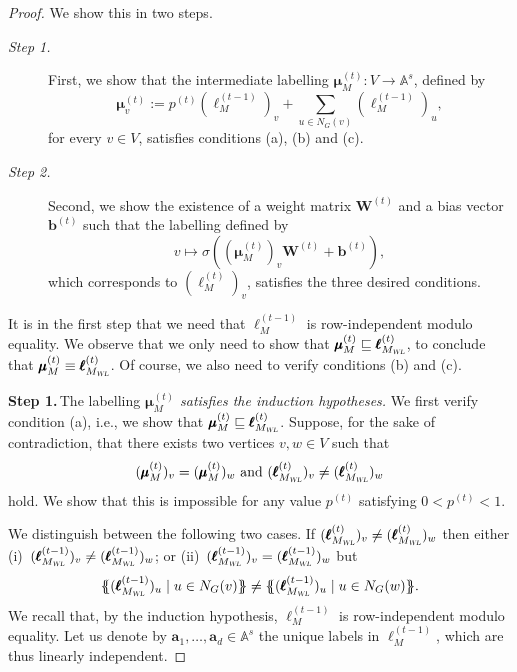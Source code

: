 \begin{proof}
We show this in two steps.
\begin{description}
	\item [\textit{Step 1.}] First, we show that the intermediate labelling $\pmb{\mu}_M^{(t)}:V\to\mathbb{A}^s$, defined by
\begin{equation}\pmb{\mu}_v^{(t)}:=p^{(t)}(\pmb{\ell}_M^{(t-1)})_v+\sum_{u\in N_G(v)}(\pmb{\ell}_M^{(t-1)})_u, \label{eq:mu}
\end{equation}
for every $v\in V$, satisfies conditions (a), (b) and (c). 
\item  [\textit{Step 2.}]
Second, we show the existence of a weight matrix $\mathbf{W}^{(t)}$ and a bias vector
$\mathbf{b}^{(t)}$ such that the labelling defined by
$$
v\mapsto \sigma\left((\pmb{\mu}_M^{(t)})_v\mathbf{W}^{(t)}+ \mathbf{b}^{(t)}\right),
$$
which corresponds to $(\pmb{\ell}_M^{(t)})_v$, satisfies the  three desired conditions.
\end{description}
It is in the first step that we need that $\pmb{\ell}_M^{(t-1)}$ is row-independent modulo equality. We observe that we only need to show that $\pmb{\mu}_M^{(t)}\sqsubseteq \pmb{\ell}_{M_{\textsl{WL}}}^{(t)}$, to conclude that $\pmb{\mu}_M^{(t)}\equiv \pmb{\ell}_{M_{\textsl{WL}}}^{(t)}$. Of course, we also need to verify conditions (b) and (c).

\smallskip
\noindent
\textbf{Step 1.\,}The labelling \textit{$\pmb{\mu}_M^{(t)}$ satisfies the induction hypotheses.}
We first verify condition (a), i.e.,
we show that $\pmb{\mu}_M^{(t)}\sqsubseteq \pmb{\ell}_{M_{\textsl{WL}}}^{(t)}$. Suppose, for the sake of contradiction, that there exists two vertices $v,w\in V$ such that 
	\begin{equation}
		(\pmb{\mu}_M^{(t)})_{v}=(\pmb{\mu}_M^{(t)})_{w} \text{ and } (\pmb{\ell}_{M_{\textsl{WL}}}^{(t)})_v\neq(\pmb{\ell}_{M_{\textsl{WL}}}^{(t)})_w \label{eq:contra}
	\end{equation}
	hold.
We show that this is impossible for any value $p^{(t)}$ satisfying $0<p^{(t)}<1$. 

We distinguish between the following two cases. If $ (\pmb{\ell}_{M_{\textsl{WL}}}^{(t)})_v\neq(\pmb{\ell}_{M_{\textsl{WL}}}^{(t)})_w$ then either
(i)~$(\pmb{\ell}_{M_{\textsl{WL}}}^{(t-1)})_v\neq(\pmb{\ell}_{M_{\textsl{WL}}}^{(t-1)})_w$; or 
(ii)~$(\pmb{\ell}_{M_{\textsl{WL}}}^{(t-1)})_v=(\pmb{\ell}_{M_{\textsl{WL}}}^{(t-1)})_w$
but
	$$
	\ldbl (\pmb{\ell}_{M_{\textsl{WL}}}^{(t-1)})_u \st u \in N_G(v) \rdbl\neq
	\ldbl(\pmb{\ell}_{M_{\textsl{WL}}}^{(t-1)})_u \st u \in N_G(w) \rdbl.
	$$
We recall that, by the induction hypothesis, $\pmb{\ell}^{(t-1)}_M$ is row-independent modulo equality. Let us denote by $\mathbf{a}_1,\ldots,\mathbf{a}_d \in \mathbb{A}^s$ the unique labels
in $\pmb{\ell}^{(t-1)}_M$, which are thus linearly independent.
%


\end{proof}
